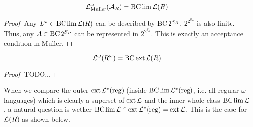 \begin{lemma}
\label{gen:lang_omega_muller}
\[ \mathcal{L}^\omega_{\text{Muller}}(\mathcal{A}_R) = \operatorname{BC} \lim \mathcal{L}(R) \]
\begin{proof}
Any $L^\omega \in \operatorname{BC} \lim \mathcal{L}(R)$ can be described by $\operatorname{BC} 2^{S_R}$. $2^{2^{S_R}}$ is also finite. Thus, any $A \in \operatorname{BC} 2^{S_R}$ can be represented in $2^{2^{S_R}}$. This is exactly an acceptance condition in Muller.
\end{proof}
\end{lemma}

\begin{lemma}
\label{gen:Romega=BCextR}
\[ \mathcal{L}^\omega(R^\omega) = \operatorname{BC} \operatorname{ext} \mathcal{L}(R) \]
\begin{proof}
TODO...
\end{proof}
\end{lemma}

When we compare the outer $\operatorname{ext} \mathcal{L}^*(\text{reg})$ (inside $\operatorname{BC} \lim \mathcal{L}^*(\text{reg})$, i.e. all regular $\omega$-languages) which is clearly a superset of $\operatorname{ext} \mathcal{L}$ and the inner whole class $\operatorname{BC} \lim \mathcal{L}$, a natural question is wether $\operatorname{BC} \lim \mathcal{L} \cap \operatorname{ext} \mathcal{L}^*(\text{reg}) = \operatorname{ext} \mathcal{L}$. This is the case for $\mathcal{L}(R)$ as shown below.

